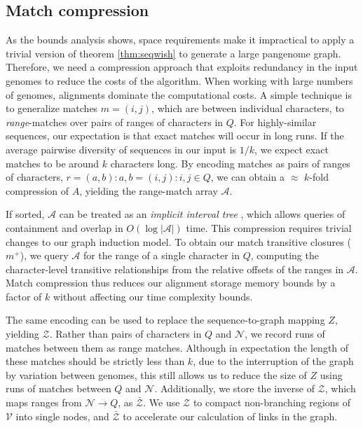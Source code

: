 \documentclass{bioinfo}
\theoremstyle{definition}
\begin{document}

\subsection{Match compression}
\label{sec:matchcompression}

As the bounds analysis shows, space requirements make it impractical to apply a trivial version of theorem \ref{thm:seqwish} to generate a large pangenome graph.
Therefore, we need a compression approach that exploits redundancy in the input genomes to reduce the costs of the algorithm.
When working with large numbers of genomes, alignments dominate the computational costs.
A simple technique is to generalize matches $m = (i, j)$, which are between individual characters, to \textit{range}-matches over pairs of ranges of characters in $Q$.
For highly-similar sequences, our expectation is that exact matches will occur in long runs.
If the average pairwise diversity of sequences in our input is $1/k$, we expect exact matches to be around $k$ characters long.
By encoding matches as pairs of ranges of characters, $r = (a, b) : a, b = (i, j) : i, j \in Q$, we can obtain a $\approx$ $k$-fold compression of $A$, yielding the range-match array $\mathcal{A}$.

If sorted, $\mathcal{A}$ can be treated as an \textit{implicit interval tree} \citep{Li_bedtk_2020}, which allows queries of containment and overlap in $O(\log |\mathcal{A}|)$ time.
This compression requires trivial changes to our graph induction model.
To obtain our match transitive closures ($m^+$), we query $\mathcal{A}$ for the range of a single character in $Q$, computing the character-level transitive relationships from the relative offsets of the ranges in $\mathcal{A}$.
Match compression thus reduces our alignment storage memory bounds by a factor of $k$ without affecting our time complexity bounds.

The same encoding can be used to replace the sequence-to-graph mapping $Z$, yielding $\mathcal{Z}$.
Rather than pairs of characters in $Q$ and $\mathcal{N}$, we record runs of matches between them as range matches.
Although in expectation the length of these matches should be strictly less than $k$, due to the interruption of the graph by variation between genomes, this still allows us to reduce the size of $Z$ using runs of matches between $Q$ and $\mathcal{N}$.
Additionally, we store the inverse of $\mathcal{Z}$, which maps ranges from $\mathcal{N} \to Q$, as $\bar{\mathcal{Z}}$.
We use $\mathcal{Z}$ to compact non-branching regions of $\mathcal{V}$ into single nodes, and $\bar{\mathcal{Z}}$ to accelerate our calculation of links in the graph.
\end{document}
